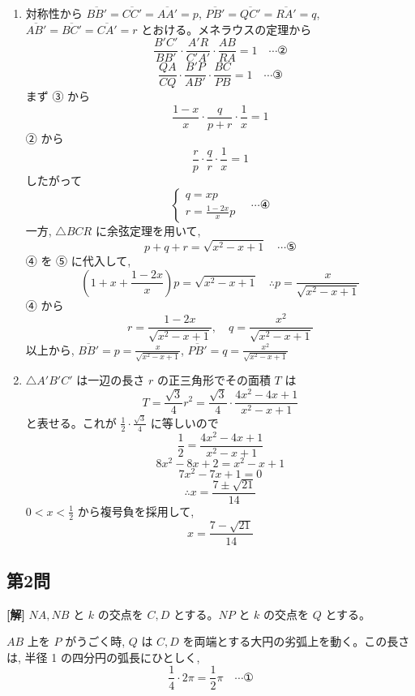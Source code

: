 \documentclass[../main.tex]{subfiles}
\begin{document}
\begin{enumerate}
  \item[(1)] 対称性から $\overline{BB'} = \overline{CC'} = \overline{AA'} = p$,
    $\overline{PB'} = \overline{QC'} = \overline{RA'} = q$, $\overline{AB'} = \overline{BC'} = \overline{CA'} = r$
    とおける。メネラウスの定理から
    \[
      \frac{B'C'}{BB'} \cdot \frac{A'R}{C'A'} \cdot \frac{AB}{RA} = 1 \quad \cdots \text{②}
    \]
    \[
      \frac{QA}{CQ} \cdot \frac{B'P}{AB'} \cdot \frac{BC}{PB} = 1 \quad \cdots \text{③}
    \]
    まず ③ から
    \[
      \frac{1-x}{x} \cdot \frac{q}{p+r} \cdot \frac{1}{x} = 1
    \]
    ② から
    \[
      \frac{r}{p} \cdot \frac{q}{r} \cdot \frac{1}{x} = 1
    \]
    したがって
    \[
      \begin{cases}
        q = xp \\
        r = \frac{1-2x}{x} p
      \end{cases}
      \quad \cdots \text{④}
    \]
    一方, $\triangle BCR$ に余弦定理を用いて,
    \[
      p + q + r = \sqrt{x^2 - x + 1} \quad \cdots \text{⑤}
    \]
    ④ を ⑤ に代入して,
    \[
      \left( 1 + x + \frac{1-2x}{x} \right) p = \sqrt{x^2 - x + 1} \quad \therefore p = \frac{x}{\sqrt{x^2 - x + 1}}
    \]
    ④ から
    \[
      r = \frac{1-2x}{\sqrt{x^2 - x + 1}}, \quad q = \frac{x^2}{\sqrt{x^2 - x + 1}}
    \]
    以上から, $\overline{BB'} = p = \frac{x}{\sqrt{x^2 - x + 1}}$, $\overline{PB'} = q = \frac{x^2}{\sqrt{x^2 - x + 1}}$

  \item[(2)] $\triangle A'B'C'$ は一辺の長さ $r$ の正三角形でその面積 $T$ は
    \[
      T = \frac{\sqrt{3}}{4} r^2 = \frac{\sqrt{3}}{4} \cdot \frac{4x^2 - 4x + 1}{x^2 - x + 1}
    \]
    と表せる。これが $\frac{1}{2} \cdot \frac{\sqrt{3}}{4}$ に等しいので
    \[
      \frac{1}{2} = \frac{4x^2 - 4x + 1}{x^2 - x + 1}
    \]
    \[
      8x^2 - 8x + 2 = x^2 - x + 1
    \]
    \[
      7x^2 - 7x + 1 = 0
    \]
    \[
      \therefore x = \frac{7 \pm \sqrt{21}}{14}
    \]
    $0 < x < \frac{1}{2}$ から複号負を採用して,
    \[
      x = \frac{7 - \sqrt{21}}{14}
    \]
\end{enumerate}

\subsection*{第2問}

\noindent
\textbf{[解]} $NA, NB$ と $k$ の交点を $C, D$ とする。$NP$ と $k$ の交点を $Q$ とする。

$AB$ 上を $P$ がうごく時, $Q$ は $C, D$ を両端とする大円の劣弧上を動く。この長さは, 半径 1 の四分円の弧長にひとしく,
\[
  \frac{1}{4} \cdot 2\pi = \frac{1}{2}\pi \quad \cdots \text{①}
\]
\end{document}
